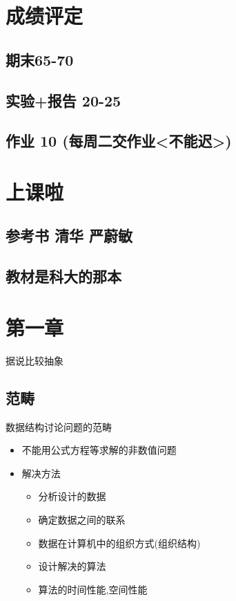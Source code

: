 \documentclass[11pt]{article}
\date{\today}
\title{}
\begin{document}
\tableofcontents

\section{成绩评定}
\label{sec:org90e96e1}
\subsection{期末65-70}
\label{sec:org60d538c}
\subsection{实验+报告 20-25}
\label{sec:org5b3a171}
\subsection{作业 10 (每周二交作业<不能迟>)}
\label{sec:org8337d4a}
\section{上课啦}
\label{sec:org19f163f}
\subsection{参考书 清华 严蔚敏}
\label{sec:org3460792}
\subsection{教材是科大的那本}
\label{sec:org23cecda}
\section{第一章}
\label{sec:orgd194043}
据说比较抽象
\subsection{范畴}
\label{sec:org79d0090}
数据结构讨论问题的范畴
\begin{itemize}
\item 不能用公式方程等求解的非数值问题
\item 解决方法
\begin{itemize}
\item 分析设计的数据
\item 确定数据之间的联系
\item 数据在计算机中的组织方式(组织结构)
\item 设计解决的算法
\item 算法的时间性能,空间性能
\end{itemize}
\end{itemize}
\end{document}
